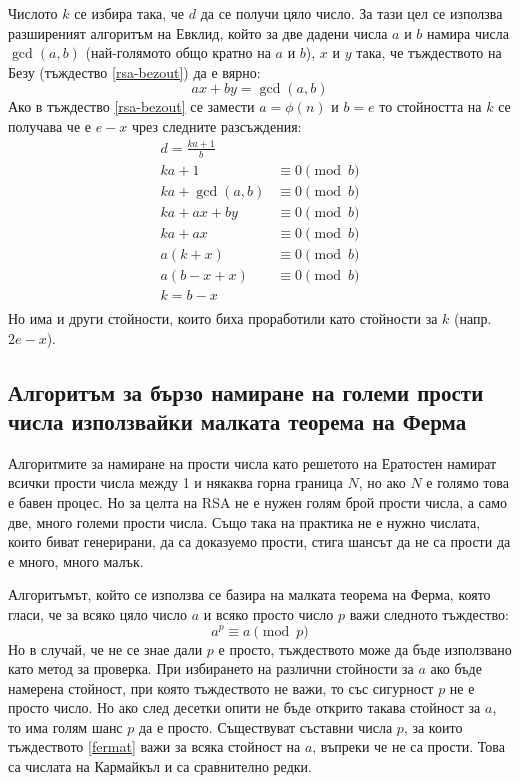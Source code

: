   Числото $k$ се избира така, че $d$ да се получи цяло число. За тази цел се използва разширеният алгоритъм на Евклид, който за две дадени числа $a$ и $b$ намира числа $\gcd(a,b)$ (най-голямото общо кратно на $a$ и $b$), $x$ и $y$ така, че тъждеството на Безу (тъждество \ref{rsa-bezout}) да е вярно:
  \begin{equation}
    ax+by = \gcd(a,b)
    \label{rsa-bezout}
  \end{equation}
  Ако в тъждество \ref{rsa-bezout} се замести $a=\phi(n)$ и $b=e$ то стойността на $k$ се получава че е $e-x$ чрез следните разсъждения:
  \begin{equation}
    \begin{alignedat}{1}
      d = \frac{ka+1}{b} \\
      ka + 1 &\equiv 0 \pmod{b} \\
      ka + \gcd(a,b) &\equiv 0 \pmod{b} \\
      ka + ax + by &\equiv 0 \pmod{b} \\
      ka + ax &\equiv 0 \pmod{b} \\
      a(k+x) &\equiv 0 \pmod{b} \\
      a(b-x+x) &\equiv 0 \pmod{b} \\
      k = b - x \\
    \end{alignedat}
    \label{rsa-finding-k}
  \end{equation}
  Но има и други стойности, които биха проработили като стойности за $k$ (напр. $2e-x$).

  \subsection{Алгоритъм за бързо намиране на големи прости числа използвайки малката теорема на Ферма} \label{primesalgo}
  Алгоритмите за намиране на прости числа като решетото на Ератостен\cite{primesieve} намират всички прости числа между 1 и някаква горна граница $N$, но ако $N$ е голямо това е бавен процес. Но за целта на RSA не е нужен голям брой прости числа, а само две, много големи прости числа. Също така на практика не е нужно числата, които биват генерирани, да са доказуемо прости, стига шансът да не са прости да е много, много малък.

  Алгоритъмът, който се използва се базира на малката теорема на Ферма, която гласи, че за всяко цяло число $a$ и всяко просто число $p$ важи следното тъждество:
  \begin{equation}
    a^p \equiv a \pmod{p}
    \label{fermat}
  \end{equation}
  Но в случай, че не се знае дали $p$ е просто, тъждеството може да бъде използвано като метод за проверка. При избирането на различни стойности за $a$ ако бъде намерена стойност, при която тъждеството не важи, то със сигурност $p$ не е просто число. Но ако след десетки опити не бъде открито такава стойност за $a$, то има голям шанс $p$ да е просто.
  Съществуват съставни числа $p$, за които тъждеството \ref{fermat} важи за всяка стойност на $a$, въпреки че не са прости. Това са числата на Кармайкъл и са сравнително редки.\cite{carmichaelrare} %

